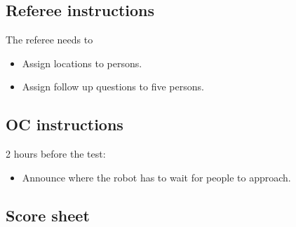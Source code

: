 \subsection{Referee instructions}
The referee needs to
\begin{itemize}
	\item Assign locations to persons.
	\item Assign follow up questions to five persons.
\end{itemize}

\subsection{OC instructions}
2 hours before the test:
\begin{itemize}
	\item Announce where the robot has to wait for people to approach.
\end{itemize}

\newpage
\subsection{Score sheet}
